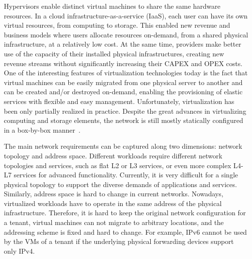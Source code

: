 Hypervisors enable distinct virtual machines to share the same hardware resources. In a 
cloud infrastructure-as-a-service (IaaS), each user can have its own virtual resources, from computing to 
storage.
This enabled new revenue and business models where users allocate resources on-demand, from a shared 
physical infrastructure, at a relatively low cost.
At the same time, providers make better use of the capacity of their installed physical 
infrastructures, creating new revenue streams without significantly increasing their CAPEX and OPEX 
costs. One of the interesting features of virtualization technologies today is the fact that virtual 
machines can be easily migrated from one physical server to another and can 
be created and/or destroyed on-demand, enabling the provisioning of elastic services with flexible 
and easy management.
Unfortunately, virtualization has been only partially realized in practice. Despite the great advances 
in virtualizing computing and storage elements, the network is still mostly statically configured in a box-by-box manner~\cite{chowdhury2010}.

The main network requirements can be captured along two dimensions: network topology and address space.
Different workloads require different network topologies and services, such as flat L2 or L3 services, or even more complex L4-L7 
services for advanced functionality.
Currently, it is very difficult for a single physical topology to support the diverse demands 
of applications and services. Similarly, address space is hard to change in current networks. Nowadays, 
virtualized workloads have to operate in the same address of the physical infrastructure. 
Therefore, it is hard to keep the original network configuration for a tenant, virtual machines can not migrate to arbitrary locations, and the addressing scheme is fixed and hard to change. 
For example, IPv6 cannot be used by the VMs of a tenant if the underlying physical forwarding devices support only IPv4.


